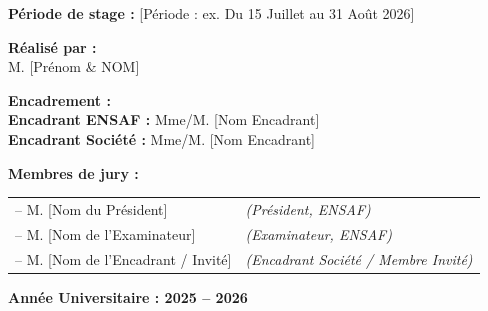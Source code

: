\begin{titlepage}
\begin{center}
    {\textbf{P\'eriode de stage :}} [P\'eriode : ex. Du 15 Juillet au 31 Ao\^ut 2026]\\[0.8cm]
\end{center}

\vfill

\noindent
\begin{minipage}[t]{0.45\textwidth}
    \textbf{R\'ealis\'e par :}\\[0.2cm]
    M. [Pr\'enom \& NOM]
\end{minipage}
\hfill
\begin{minipage}[t]{0.52\textwidth}
    \raggedleft
    \textbf{Encadrement :}\\[0.2cm]
    \textbf{Encadrant ENSAF :} Mme/M. [Nom Encadrant]\\
    \textbf{Encadrant Soci\'et\'e :} Mme/M. [Nom Encadrant]
\end{minipage}

\vspace{0.8cm}

\noindent
\textbf{Membres de jury :}\\[0.15cm]
\begin{tabular}{@{}ll}
    -- M. [Nom du Président] & \textit{(Pr\'esident, ENSAF)} \\
    -- M. [Nom de l'Examinateur] & \textit{(Examinateur, ENSAF)} \\
    -- M. [Nom de l'Encadrant / Invit\'e] & \textit{(Encadrant Soci\'et\'e / Membre Invit\'e)} \\
\end{tabular}

\vfill

\begin{center}
    \small \textbf{Ann\'ee Universitaire : 2025 -- 2026}
\end{center}

\end{titlepage}
